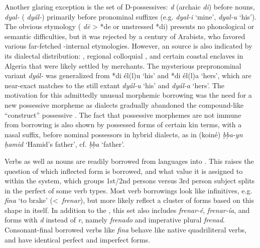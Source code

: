 \documentclass[output=paper]{langsci/langscibook}
\begin{document}
Another glaring exception is the set of D-possessives: \textit{d} (archaic \textit{di}) before nouns, \textit{dyal-} ( \textit{dyál-}) primarily before pronominal suffixes (e.g. \textit{dyal-i} ‘mine’, \textit{dyal-u} ‘his’). The obvious etymology ( \textit{dē} >  *de or unstressed *di) presents no phonological or semantic difficulties, but it was rejected by a century of  Arabists, who favored various far-fetched -internal etymologies. However, an  source is also indicated by its dialectal distribution:  , regional colloquial  , and certain coastal enclaves in Algeria that were likely settled by  merchants. The mysterious prepronominal variant \textit{dyál-} was generalized from  *di él(l)u ‘his’ and  *di él(l)a ‘hers’, which are near-exact matches to the still extant  \textit{dyál-u} ‘his’ and \textit{dyál-a} ‘hers’. The motivation for this admittedly unusual morphemic borrowing was the need for a new possessive morpheme as  dialects gradually abandoned the compound-like  “construct” possessive \citep{Heath2015}. The fact that possessive morphemes are not immune from borrowing is also shown by possessed forms of certain kin terms, with a  nasal suffix, before nominal possessors in hybrid dialects, as in (koiné) \textit{ḅḅa-yn} \textit{ḥamid} ‘Hamid’s father’, cf. \textit{ḅḅa} ‘father’. 

Verbs as well as nouns are readily borrowed from  languages into . This raises the question of which  inflected form is borrowed, and what value it is assigned to within the   system, which groups 1st/2nd persons versus 3rd person subject splits in the perfect of some verb types. Most  verb borrowings look like  infinitives, e.g. \textit{f{\R}ina{\R}} ‘to brake’ (<~\textit{frenar}), but more likely reflect a cluster of forms based on this  shape in  itself. In addition to the , this set also includes  \textit{frenar-é},  \textit{frenar-ía}, and forms with \textit{d} instead of \textit{r}, namely  \textit{frenado} and imperative plural \textit{frenad}. Consonant-final borrowed verbs like \textit{f{\R}ina{\R}} behave like native  quadriliteral verbs, and have identical perfect and imperfect forms. 
\end{document}
